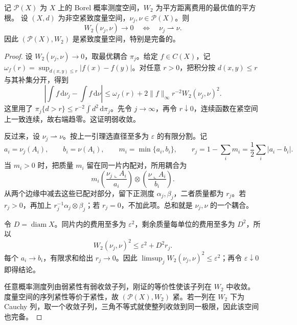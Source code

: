 \begin{theorem}\label{g3:thm:C-wasserstein-weak-topology}
	记 \(\mathcal P(X)\) 为 \(X\) 上的 Borel 概率测度空间，\(W_2\) 为平方距离费用的最优值的平方根。
	设 \((X,d)\) 为非空紧致度量空间，\(\nu_j,\nu\in\mathcal P(X)\)。则
	\[
		W_2(\nu_j,\nu)\longrightarrow0
		\quad\Longleftrightarrow\quad
		\nu_j\rightharpoonup\nu.
	\]
	因此 \((\mathcal P(X),W_2)\) 是紧致度量空间，特别是完备的。
\end{theorem}
\begin{proof}
	设 \(W_2(\nu_j,\nu)\to0\)，取最优耦合 \(\pi_j\)。给定 \(f\in C(X)\)，记
	\(\omega_f(r)=\sup_{d(x,y)\le r}|f(x)-f(y)|\)。对任意 \(r>0\)，把积分按 \(d(x,y)\le r\) 与其补集分开，得到
	\[
		\left|\int f\,\mathrm d\nu_j-\int f\,\mathrm d\nu\right|
		\le\omega_f(r)
		 +2\|f\|_\infty r^{-2}W_2(\nu_j,\nu)^2.
	\]
	这里用了
	\(\pi_j\{d>r\}\le r^{-2}\int d^2\,\mathrm d\pi_j\)。先令 \(j\to\infty\)，再令 \(r\downarrow0\)，连续函数在紧空间上一致连续，故右端趋零。这证明弱收敛。

	反过来，设 \(\nu_j\rightharpoonup\nu\)。按上一引理选直径至多为 \(\varepsilon\) 的有限分割。记
	\[
		a_i=\nu_j(A_i),\qquad b_i=\nu(A_i),\qquad
		m_i=\min\{a_i,b_i\},\qquad
		r_j=1-\sum_i m_i=\frac12\sum_i|a_i-b_i|.
	\]
	当 \(m_i>0\) 时，把质量 \(m_i\) 留在同一片内配对，所用耦合为
	\[
		m_i\left(\frac{\nu_j\llcorner A_i}{a_i}\right)
		    \otimes\left(\frac{\nu\llcorner A_i}{b_i}\right).
	\]
	从两个边缘中减去这些已配对部分，留下正测度
	\(\alpha_j,\beta_j\)，二者质量都为 \(r_j\)。若 \(r_j>0\)，再加上
	\(r_j^{-1}\alpha_j\otimes\beta_j\)；若 \(r_j=0\)，不加此项。总和就是 \(\nu_j,\nu\) 的一个耦合。

	令 \(D=\operatorname{diam}X\)。同片内的费用至多为 \(\varepsilon^2\)，剩余质量每单位的费用至多为 \(D^2\)，所以
	\[
		W_2(\nu_j,\nu)^2
		\le\varepsilon^2+D^2r_j.
	\]
	每个 \(a_i\to b_i\)，有限求和给出 \(r_j\to0\)。因此
	\(\limsup_jW_2(\nu_j,\nu)^2\le\varepsilon^2\)；再令 \(\varepsilon\downarrow0\) 即得结论。

	任意概率测度列由弱紧性有弱收敛子列，刚证的等价性使该子列在 \(W_2\) 中收敛。度量空间的序列紧性等价于紧性，故 \((\mathcal P(X),W_2)\) 紧。若一列在 \(W_2\) 下为 Cauchy 列，取一个收敛子列，三角不等式就使整列收敛到同一极限，因此该空间也完备。
\end{proof}

